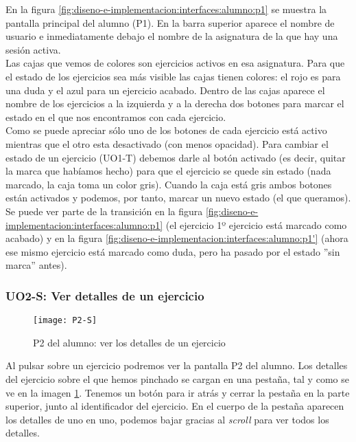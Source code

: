En la figura \ref{fig:diseno-e-implementacion:interfaces:alumno:p1} se muestra la pantalla principal del alumno (P1). En la barra superior aparece el nombre de usuario e inmediatamente debajo el nombre de la asignatura de la que hay una sesión activa.\\

Las cajas que vemos de colores son ejercicios activos en esa asignatura. Para que el estado de los ejercicios sea más visible las cajas tienen colores: el rojo es para una duda y el azul para un ejercicio acabado. Dentro de las cajas aparece el nombre de los ejercicios a la izquierda y a la derecha dos botones para marcar el estado en el que nos encontramos con cada ejercicio.\\

Como se puede apreciar sólo uno de los botones de cada ejercicio está activo mientras que el otro esta desactivado (con menos opacidad). Para cambiar el estado de un ejercicio (UO1-T) debemos darle al botón activado (es decir, quitar la marca que habíamos hecho) para que el ejercicio se quede sin estado (nada marcado, la caja toma un color gris). Cuando la caja está gris ambos botones están activados y podemos, por tanto, marcar un nuevo estado (el que queramos). Se puede ver parte de la transición en la figura \ref{fig:diseno-e-implementacion:interfaces:alumno:p1} (el ejercicio 1º ejercicio está marcado como acabado) y en la figura \ref{fig:diseno-e-implementacion:interfaces:alumno:p1'} (ahora ese mismo ejercicio está marcado como duda, pero ha pasado por el estado ''sin marca'' antes).\\

\subsubsection{UO2-S: Ver detalles de un ejercicio}
\label{diseno-e-implementacion:interfaces:alumno:uo2-s}

\begin{figure}[H]
	\centering
	\texttt{[image: P2-S]}
	\caption{P2 del alumno: ver los detalles de un ejercicio}
	\label{diseno-e-implementacion:interfaces:alumno:p2}
\end{figure}

Al pulsar sobre un ejercicio podremos ver la pantalla P2 del alumno. Los detalles del ejercicio sobre el que hemos pinchado se cargan en una pestaña, tal y como se ve en la imagen \ref{diseno-e-implementacion:interfaces:alumno:p2}. Tenemos un botón para ir atrás y cerrar la pestaña en la parte superior, junto al identificador del ejercicio. En el cuerpo de la pestaña aparecen los detalles de uno en uno, podemos bajar gracias al \textit{scroll} para ver todos los detalles.\\

